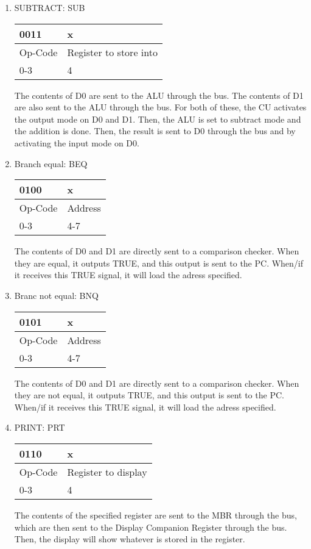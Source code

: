 \documentclass{article}
\begin{document}
\begin{enumerate}
\item SUBTRACT: SUB\\
  \begin{tabularx}{\textwidth}{|X|X|}
    \hline 0011 & x
    \\ \hline Op-Code & Register to store into
    \\ \hline 0-3 & 4
    \\ \hline
  \end{tabularx}
The contents of D0 are sent to the ALU through the bus. The contents of D1 are also sent to the ALU through the bus. For both of these, the CU activates the output mode on D0 and D1. Then, the ALU is set to subtract mode and the addition is done. Then, the result is sent to D0 through the bus and by activating the input mode on D0.  

\item Branch equal: BEQ\\
  \begin{tabularx}{\textwidth}{|X|X|}
    \hline 0100 & x
    \\ \hline Op-Code & Address
    \\ \hline 0-3 & 4-7
    \\ \hline
  \end{tabularx}
The contents of D0 and D1 are directly sent to a comparison checker. When they are equal, it outputs TRUE, and this output is sent to the PC. When/if it receives this TRUE signal, it will load the adress specified.
  
\item Branc not equal: BNQ\\
  \begin{tabularx}{\textwidth}{|X|X|}
    \hline 0101 & x
    \\ \hline Op-Code & Address
    \\ \hline 0-3 & 4-7
    \\ \hline
  \end{tabularx}
The contents of D0 and D1 are directly sent to a comparison checker. When they are not equal, it outputs TRUE, and this output is sent to the PC. When/if it receives this TRUE signal, it will load the adress specified.

\item PRINT: PRT\\
  \begin{tabularx}{\textwidth}{|X|X|}
    \hline 0110 & x
    \\ \hline Op-Code & Register to display
    \\ \hline 0-3 & 4
    \\ \hline
  \end{tabularx}
The contents of the specified register are sent to the MBR through the bus, which are then sent to the Display Companion Register through the bus. Then, the display will show whatever is stored in the register.


\end{enumerate}
\end{document}
